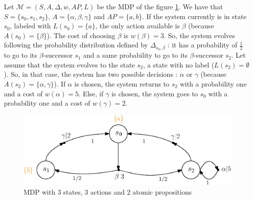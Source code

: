 \begin{example}\label{simple-mdp}
  Let $\mathcal{M} = (S, A, \Delta, w, AP, L)$ be the MDP of the figure \ref{mdp01}. We have that $S = \{s_0, s_1, s_2\}$, $A = \{\alpha, \beta, \gamma\}$ and $AP=\{a, b\}$. If the system currently is in state $s_0$, labeled with $L(s_0) = \{a\}$, the only action available is $\beta$ (because $A(s_0) = \{\beta\}$).
  The cost of choosing $\beta$ is $w(\beta) = 3$.
  So, the system evolves following the probability distribution defined by $\Delta_{s_0, \beta}$ : it has a probability of $\frac{1}{2}$
  to go to its $\beta$-successor $s_1$ and a same probability to go to its $\beta$-successor $s_2$. Let assume that the system evolves to the state $s_2$, a state with no label ($L(s_2) = \emptyset$). So, in that case, the system has two possible decisions : $\alpha$ or $\gamma$ (because $A(s_2) = \{\alpha, \gamma\}$). If $\alpha$ is chosen, the system returns to $s_2$ with a probability one and a cost of $w(\alpha) = 5$. Else, if $\gamma$ is chosen, the system goes to $s_0$ with a probability one and a cost of $w(\gamma) = 2$.
  \begin{figure}[h!]
    \centering
    \includegraphics[width=0.7\linewidth]{resources/simple-mdp}
    \caption{MDP with $3$ states, $3$ actions and $2$ atomic propositions}\label{mdp01}
  \end{figure}
\end{example}

